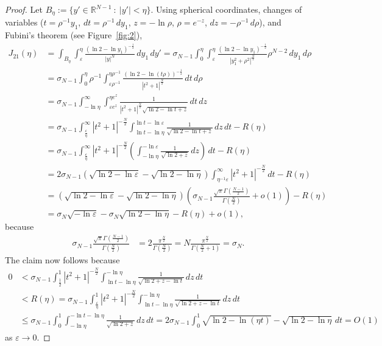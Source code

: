 \documentclass[11pt]{article}
\newcommand{\eps}{{\varepsilon}}
\newcommand{\R}{\mathbb{R}}
\numberwithin{equation}{section}
\begin{document}
\begin{proof}
Let $B_\eta:=\{y'\in \R^{N-1}\::\: |y'|<\eta\}$. Using spherical coordinates, changes of variables ($t=\rho^{-1} y_1$,
 $dt=\rho^{-1}\, dy_1$, 
 $z=-\ln\rho$,
 $\rho=e^{-z}$, $dz = -\rho^{-1}\, d\rho$),
 and Fubini's theorem (see Figure~\ref{fig:2}),
\begin{align*}
J_{21}(\eta)
&=\int_{B_\eta}\int_\eps^\eta  \frac{(\ln 2-\ln y_1)^{-\frac{1}{2}}}{|y|^N}\, dy_1\, dy'
=\sigma_{N-1} \int_{0}^\eta\int_\eps^\eta \frac{(\ln 2-\ln y_1)^{-\frac{1}{2}}}{|y_1^2+\rho^2|^\frac{N}{2}}\rho^{N-2}\, dy_1\, d\rho\\
&=\sigma_{N-1}\int_0^\eta  \rho^{-1}  \int_{\eps\rho^{-1}}^{\eta\rho^{-1}} \frac{(\ln 2-\ln(t\rho))^{-\frac{1}{2}}}{|t^2+1|^\frac{N}{2}}\, dt\,d\rho\\
&=\sigma_{N-1}\int_{-\ln \eta}^\infty\int_{\eps e^z}^{\eta e^z} \frac{1}{|t^2+1|^\frac{N}{2}\sqrt{\ln 2-\ln t+z}}\, dt\,dz\\
&=\sigma_{N-1}\int_{\frac{\eps}{\eta}}^\infty |t^2+1|^{-\frac{N}{2}} \int_{\ln t-\ln \eta}^{\ln t-\ln\eps} \frac{1}{\sqrt{\ln 2-\ln t+z}}\, dz\,dt-R(\eta)\\
&=\sigma_{N-1}\int_{\frac{\eps}{\eta}}^\infty |t^2+1|^{-\frac{N}{2}} \left(\int_{-\ln \eta}^{-\ln\eps} \frac{1}{\sqrt{\ln 2+z}}\, dz\right)\,dt-R(\eta)\\
&=2\sigma_{N-1}\left(\sqrt{\ln 2-\ln \eps}-\sqrt{\ln 2-\ln \eta}\right)\int_{\eta^{-1}\eps}^\infty |t^2+1|^{-\frac{N}{2}}\, dt-R(\eta)\\
&=\left(\sqrt{\ln 2-\ln \eps}-\sqrt{\ln 2-\ln \eta}\right)\left(\sigma_{N-1}\frac{\sqrt{\pi } \Gamma \left(\frac{N-1}{2}\right)}{\Gamma \left(\frac{N}{2}\right)}+o(1)\right)-R(\eta)\\
&=\sigma_N\sqrt{-\ln \eps}-\sigma_N\sqrt{\ln 2-\ln \eta}-R(\eta)+o(1),
\end{align*}
because
\begin{align*}
\sigma_{N-1}\frac{\sqrt{\pi } \Gamma \left(\frac{N-1}{2}\right)}{\Gamma \left(\frac{N}{2}\right)}
&=2\frac{\pi^{\frac{N}{2}}}{\Gamma(\frac{N}{2})}=N\frac{\pi^\frac{N}{2}}{\Gamma(\frac{N}{2}+1)}=\sigma_N.
\end{align*}
The claim now follows because
\begin{align*}
0&<\sigma_{N-1}\int_{\frac{1}{2}}^{1}|t^2+1|^{-\frac{N}{2}} 
\int_{\ln t-\ln\eta}^{-\ln \eta} \frac{1}{\sqrt{\ln 2+z-\ln t}}\, dz\,dt\\
&<R(\eta)=\sigma_{N-1}\int_{\frac{\eps}{\eta}}^{1}|t^2+1|^{-\frac{N}{2}} 
\int_{\ln t-\ln\eta}^{-\ln \eta} \frac{1}{\sqrt{\ln 2+z-\ln t}}\, dz\,dt\\
&\leq \sigma_{N-1}\int_{0}^{1}
\int_{-\ln\eta}^{-\ln t-\ln \eta} \frac{1}{\sqrt{\ln 2+z}}\, dz\,dt
=2\sigma_{N-1}\int_{0}^{1}
\sqrt{\ln 2-\ln\left(\eta  t\right)}-\sqrt{\ln 2 -\ln\eta}\,dt
=O(1)
\end{align*}
as $\eps\to 0.$
\end{proof}
\end{document}
